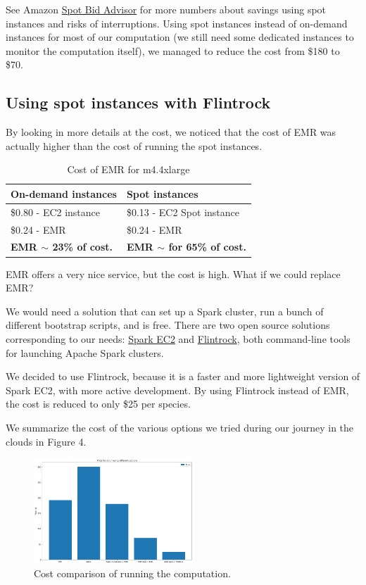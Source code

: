 \documentclass{acm_proc_article-sp}
\begin{document}
See Amazon \href{https://aws.amazon.com/ec2/spot/bid-advisor/}{Spot Bid Advisor} for more numbers about savings using spot instances and risks of interruptions.
Using spot instances instead of on-demand instances for most of our computation (we still need some dedicated instances to  monitor the computation itself), we managed to reduce the cost from \$180 to \$70.

\subsection{Using spot instances with Flintrock}
By looking in more details at the cost, we noticed that the cost of EMR was actually higher than the cost of running the spot instances.

\begin{table}[h!]
    \centering
    \begin{tabular}{|l|l|}
    On-demand instances & Spot instances\\ \hline
    \$0.80 - EC2 instance          & \$0.13 - EC2 Spot instance\\
    \$0.24 - EMR                   & \$0.24 - EMR\\
    {\bf EMR $\sim$ 23\% of cost.} & {\bf EMR $\sim$ for 65\% of cost.}
    \end{tabular}
    \caption{Cost of EMR for m4.4xlarge}
    \label{table:cost-EMR}
    \end{table}

EMR offers a very nice service, but the cost is high. What if we could replace EMR?

We would need a solution that can set up a Spark cluster, run a bunch of different bootstrap scripts, and is free. There are two open source solutions corresponding to our needs: \href{https://github.com/amplab/spark-ec2}{Spark EC2} and \href{https://github.com/nchammas/flintrock}{Flintrock}, both command-line tools for launching Apache Spark clusters.

We decided to use Flintrock, because it is a faster and more lightweight version of Spark EC2, with more active development. 
By using Flintrock instead of EMR, the cost is reduced to only \$25 per species.

We summarize the cost of the various options we tried during our journey in the clouds in Figure 4.

\begin{figure}[h]
    \centering
    \includegraphics[width=6cm]{IMG/cost-comp-1.png}
    \caption{Cost comparison of running the computation.}
    \label{fig::cost-comp-1}
\end{figure}
\end{document}
